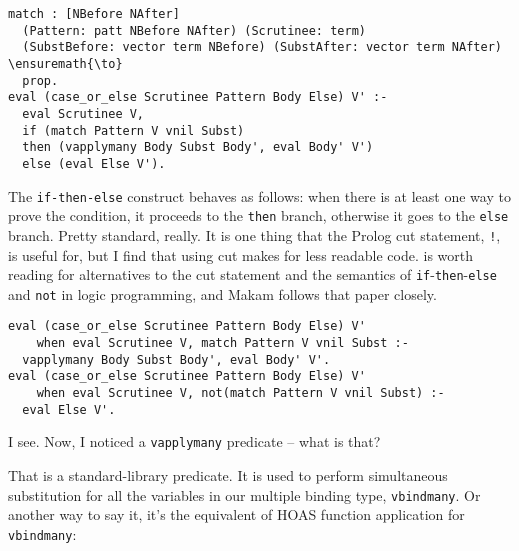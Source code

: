 \begin{verbatim}
match : [NBefore NAfter]
  (Pattern: patt NBefore NAfter) (Scrutinee: term)
  (SubstBefore: vector term NBefore) (SubstAfter: vector term NAfter) \ensuremath{\to}
  prop.
eval (case_or_else Scrutinee Pattern Body Else) V' :-
  eval Scrutinee V,
  if (match Pattern V vnil Subst)
  then (vapplymany Body Subst Body', eval Body' V')
  else (eval Else V').
\end{verbatim}

The \texttt{if-then-else} construct behaves as follows: when there is at
least one way to prove the condition, it proceeds to the \texttt{then}
branch, otherwise it goes to the \texttt{else} branch. Pretty standard,
really. It is one thing that the Prolog cut statement, \texttt{!}, is
useful for, but I find that using cut makes for less readable code.
\citet{kiselyov05backtracking} is worth reading for alternatives to the
cut statement and the semantics of
\texttt{if}-\texttt{then}-\texttt{else} and \texttt{not} in logic
programming, and Makam follows that paper closely.

\heroNEEDFEEDBACK{}

\begingroup\color{todo}

\begin{verbatim}
eval (case_or_else Scrutinee Pattern Body Else) V'
    when eval Scrutinee V, match Pattern V vnil Subst :-
  vapplymany Body Subst Body', eval Body' V'.
eval (case_or_else Scrutinee Pattern Body Else) V'
    when eval Scrutinee V, not(match Pattern V vnil Subst) :-
  eval Else V'.
\end{verbatim}

\endgroup

\heroSTUDENT{} I see. Now, I noticed a \texttt{vapplymany} predicate -- what
is that?

\heroADVISOR{} That is a standard-library predicate. It is used to perform
simultaneous substitution for all the variables in our multiple binding
type, \texttt{vbindmany}. Or another way to say it, it's the equivalent
of HOAS function application for \texttt{vbindmany}:

